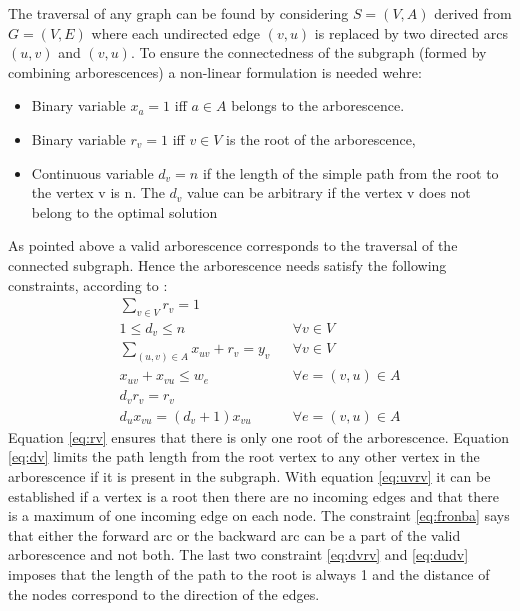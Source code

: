 \documentclass[msthesis.tex]{subfiles}
\begin{document}
The traversal of any graph can be found by considering $S = (V,A)$ derived from $G=(V,E)$  where each undirected edge $(v,u)$ is replaced by two directed arcs $(u,v)$ and $(v,u)$. To ensure the connectedness of the subgraph (formed by combining arborescences) a non-linear formulation is needed wehre:
\begin{itemize}
     \setlength\itemsep{0.5em}
    \item Binary variable $x_a = 1$ iff $a \in A$ belongs to the arborescence.
    \item Binary variable $r_v = 1$ iff $v \in V$ is the root of the arborescence,
    \item Continuous variable $d_v = n$ if the length of the simple path from the root to the vertex v is n. The $d_v$ value can be arbitrary if the vertex v does not belong to the optimal solution
\end{itemize}
As pointed above a valid arborescence corresponds to the traversal of the connected subgraph. Hence the arborescence needs satisfy the following constraints, according to \cite{haouari2013enhanced}:
\begin{align}
    \label{eq:rv}
    \sum_{v \in V} r_v = 1\\
    \label{eq:dv}
    1 \leq d_v \leq n && \forall v \in V \\
    \label{eq:uvrv}
    \sum_{(u,v) \in A} x_{uv} + r_v = y_v && \forall v \in V\\
    \label{eq:fronba}
    x_{uv} + x_{vu} \leq w_e && \forall e =(v,u) \in A\\
    \label{eq:dvrv}
    d_v r_v = r_v\\
    \label{eq:dudv}
    d_u x_{vu} = (d_v + 1) x_{vu} && \forall e=(v, u) \in A
\end{align}
Equation \ref{eq:rv} ensures that there is only one root of the arborescence. Equation \ref{eq:dv} limits the path length from the root vertex to any other vertex in the arborescence if it is present in the subgraph. With equation \ref{eq:uvrv} it can be established if a vertex is a root then there are no incoming edges and that there is a maximum of one incoming edge on each node. The constraint \ref{eq:fronba} says that either the forward arc or the backward arc can be a part of the valid arborescence and not both. The last two constraint \ref{eq:dvrv}  and \ref{eq:dudv} imposes that the length of the path to the root is always 1 and the distance of the nodes correspond to the direction of the edges.
\end{document}
